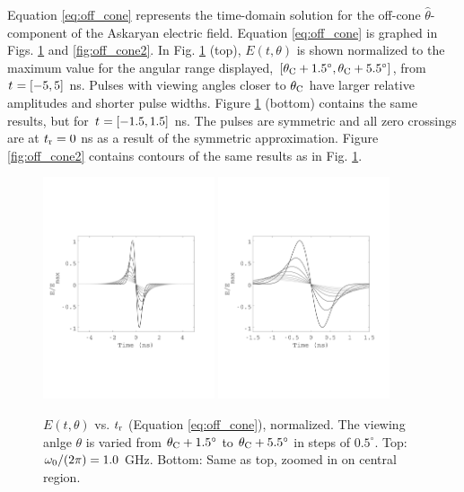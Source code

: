 \documentclass[amsmath,amssymb,aps,prd,10pt,twocolumn]{revtex4}
\begin{document}
Equation \ref{eq:off_cone} represents the time-domain solution for the off-cone $\hat{\theta}$-component of the Askaryan electric field.  Equation \ref{eq:off_cone} is graphed in Figs. \ref{fig:off_cone} and \ref{fig:off_cone2}. In Fig. \ref{fig:off_cone} (top),  $E(t,\theta)$ is shown normalized to the maximum value for the angular range displayed, $[\theta_{\rm C}+1.5^{\circ}, \theta_{\rm C}+5.5^{\circ}]$, from $t_{\rm} = [-5,5]$ ns.  Pulses with viewing angles closer to $\theta_{\rm C}$ have larger relative amplitudes and shorter pulse widths.  Figure \ref{fig:off_cone} (bottom) contains the same results, but for $t_{\rm} = [-1.5,1.5]$ ns.  The pulses are symmetric and all zero crossings are at $t_{\rm r} = 0$ ns as a result of the symmetric approximation.  Figure \ref{fig:off_cone2} contains contours of the same results as in Fig. \ref{fig:off_cone}.
\begin{figure}
\centering
\includegraphics[width=0.45\textwidth,trim=0cm 6cm 0cm 7cm,clip=true]{May5_plot1.pdf}
\includegraphics[width=0.45\textwidth,trim=0cm 6cm 0cm 7cm,clip=true]{May5_plot2.pdf}
\caption{\label{fig:off_cone} $E(t,\theta)$ vs. $t_{\rm r}$ (Equation \ref{eq:off_cone}), normalized.  The viewing anlge $\theta$ is varied from $\theta_{\rm C}+1.5^{\circ}$ to $\theta_{\rm C}+5.5^{\circ}$ in steps of $0.5^{\circ}$.  Top: $\omega_{\rm 0}/(2\pi) = 1.0$ GHz.  Bottom: Same as top, zoomed in on central region.}
\end{figure}
\end{document}
